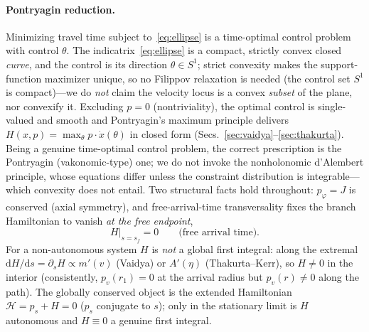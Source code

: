 \documentclass[
    aps, prd, twocolumn, superscriptaddress,
    showpacs, nofootinbib, floatfix
]{revtex4-2}
\newcommand{\dd}{\mathrm{d}}
\begin{document}
\paragraph{Pontryagin reduction.} Minimizing travel time subject
to~\eqref{eq:ellipse} is a time-optimal control problem with control $\theta$.
The indicatrix~\eqref{eq:ellipse} is a compact, strictly convex closed \emph{curve},
and the control is its direction $\theta\in S^1$; strict convexity makes the
support-function maximizer unique, so no Filippov relaxation is needed (the control
set $S^1$ is compact)---we do \emph{not} claim the velocity locus is a convex
\emph{subset} of the plane, nor convexify it. Excluding $p=0$ (nontriviality), the
optimal control is single-valued and smooth and Pontryagin's maximum principle
\cite{Pontryagin,Liberzon} delivers $H(x,p)=\max_\theta p\cdot\dot x(\theta)$ in
closed form (Secs.~\ref{sec:vaidya}--\ref{sec:thakurta}). Being a genuine
time-optimal control problem, the correct prescription is the Pontryagin
(vakonomic-type) one; we do not invoke the nonholonomic d'Alembert principle, whose
equations differ unless the constraint distribution is integrable---which convexity
does not entail. Two structural facts hold throughout: $p_\varphi=J$ is conserved (axial symmetry),
and free-arrival-time transversality fixes the branch Hamiltonian to vanish
\emph{at the free endpoint},
\begin{equation}
    H\big|_{s=s_f}=0 \qquad\text{(free arrival time).}
    \label{eq:transversality}
\end{equation}
For a non-autonomous system $H$ is \emph{not} a global first integral: along the
extremal $\dd H/\dd s=\partial_s H\propto m'(v)$ (Vaidya) or $A'(\eta)$
(Thakurta--Kerr), so $H\neq0$ in the interior (consistently, $p_v(r_1)=0$ at the
arrival radius but $p_v(r)\neq0$ along the path). The globally conserved object is
the extended Hamiltonian $\mathcal H=p_s+H=0$ ($p_s$ conjugate to $s$); only in the
stationary limit is $H$ autonomous and $H\equiv0$ a genuine first integral.
\end{document}
